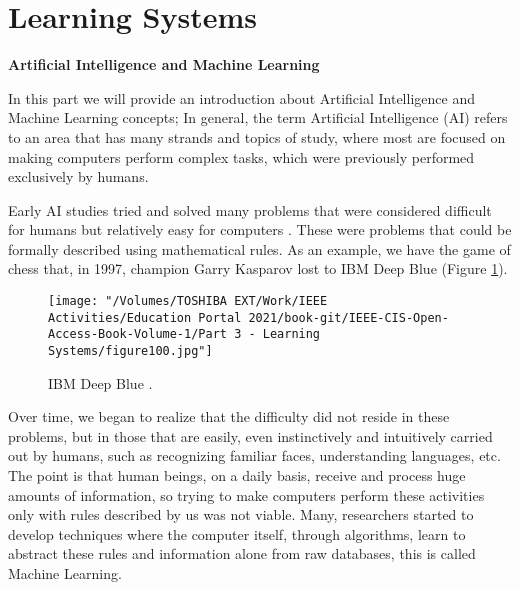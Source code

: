 \part{Learning Systems}

%

%
%

\textbf{Artificial Intelligence and Machine Learning}

In this part we will provide an introduction about Artificial Intelligence and Machine Learning concepts;
In general, the term Artificial Intelligence (AI) refers to an area that has many strands and topics of study, where most are focused on making computers perform complex tasks, which were previously performed exclusively by humans.

Early AI studies tried and solved many problems that were considered difficult for humans but relatively easy for computers \cite{goodfellow2016}. These were problems that could be formally described using mathematical rules. As an example, we have the game of chess that, in 1997, champion Garry Kasparov lost to IBM Deep Blue (Figure \ref{fig:figure100}).

\begin{figure}
    \centering
    \texttt{[image: "/Volumes/TOSHIBA EXT/Work/IEEE Activities/Education Portal 2021/book-git/IEEE-CIS-Open-Access-Book-Volume-1/Part 3 - Learning Systems/figure100.jpg"]}
    \caption{IBM Deep Blue \cite{img:deepblue}.}
    \label{fig:figure100}
\end{figure}
\newpage

Over time, we began to realize that the difficulty did not reside in these problems, but in those that are easily, even instinctively and intuitively carried out by humans, such as recognizing familiar faces, understanding languages, etc. The point is that human beings, on a daily basis, receive and process huge amounts of information, so trying to make computers perform these activities only with rules described by us was not viable. Many, researchers started to develop techniques where the computer itself, through algorithms, learn to abstract these rules and information alone from raw databases, this is called Machine Learning.

